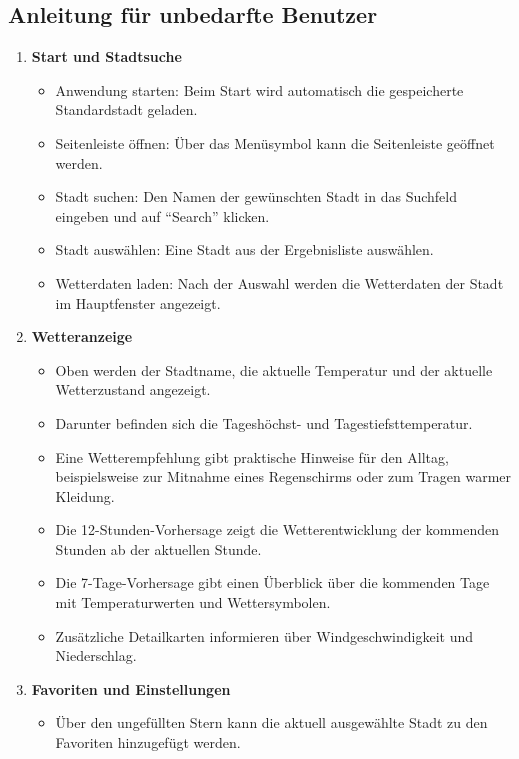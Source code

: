 \documentclass[12pt,a4paper]{article}
\begin{document}
\subsection{Anleitung für unbedarfte Benutzer}
\begin{enumerate}
  \item \textbf{Start und Stadtsuche}
    \begin{itemize}
      \item Anwendung starten: Beim Start wird automatisch
        die gespeicherte Standardstadt geladen.
      \item Seitenleiste öffnen: Über das Menüsymbol kann
        die Seitenleiste geöffnet werden.
      \item Stadt suchen: Den Namen der gewünschten Stadt in
        das Suchfeld eingeben und auf "`Search"' klicken.
      \item Stadt auswählen: Eine Stadt aus der Ergebnisliste
        auswählen.
      \item Wetterdaten laden: Nach der Auswahl werden die
        Wetterdaten der Stadt im Hauptfenster angezeigt.
    \end{itemize}
  \item \textbf{Wetteranzeige}
    \begin{itemize}
      \item Oben werden der Stadtname, die aktuelle Temperatur und der
        aktuelle Wetterzustand angezeigt.
      \item Darunter befinden sich die Tageshöchst- und
        Tagestiefsttemperatur.
      \item Eine Wetterempfehlung gibt praktische Hinweise für den
        Alltag, beispielsweise zur Mitnahme eines Regenschirms oder
        zum Tragen warmer Kleidung.
      \item Die 12-Stunden-Vorhersage zeigt die Wetterentwicklung der
        kommenden Stunden ab der aktuellen Stunde.
      \item Die 7-Tage-Vorhersage gibt einen Überblick über die
        kommenden Tage mit Temperaturwerten und Wettersymbolen.
      \item Zusätzliche Detailkarten informieren über
        Windgeschwindigkeit und Niederschlag.
    \end{itemize}
  \item \textbf{Favoriten und Einstellungen}
    \begin{itemize}
      \item Über den ungefüllten Stern kann die aktuell ausgewählte
        Stadt zu den Favoriten hinzugefügt werden.

\end{itemize}
\end{enumerate}
\end{document}
